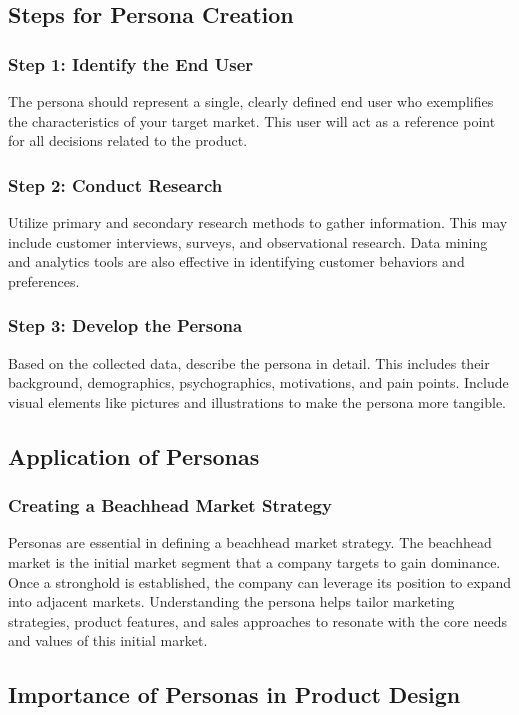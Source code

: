 \documentclass[a4paper,11pt]{article}
\begin{document}
\subsection{Steps for Persona Creation}
\subsubsection{Step 1: Identify the End User}
The persona should represent a single, clearly defined end user who exemplifies the characteristics of your target market. This user will act as a reference point for all decisions related to the product.

\subsubsection{Step 2: Conduct Research}
Utilize primary and secondary research methods to gather information. This may include customer interviews, surveys, and observational research. Data mining and analytics tools are also effective in identifying customer behaviors and preferences.

\subsubsection{Step 3: Develop the Persona}
Based on the collected data, describe the persona in detail. This includes their background, demographics, psychographics, motivations, and pain points. Include visual elements like pictures and illustrations to make the persona more tangible.

\subsection{Application of Personas}
\subsubsection{Creating a Beachhead Market Strategy}
Personas are essential in defining a beachhead market strategy. The beachhead market is the initial market segment that a company targets to gain dominance. Once a stronghold is established, the company can leverage its position to expand into adjacent markets. Understanding the persona helps tailor marketing strategies, product features, and sales approaches to resonate with the core needs and values of this initial market.

\subsection{Importance of Personas in Product Design}
\end{document}

